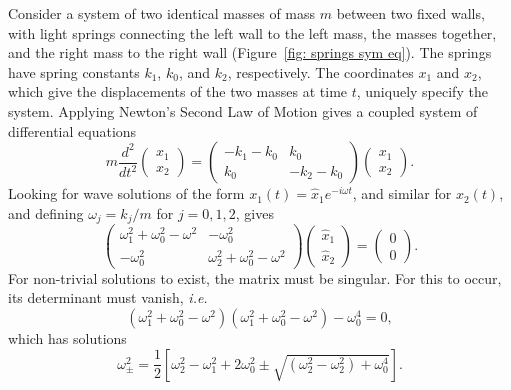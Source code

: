 \documentclass[12pt]{../style-files/ociamthesis}
\begin{document}
Consider a system of two identical masses of mass $m$ between two fixed walls, with light springs connecting the left wall to the left mass, the masses together, and the right mass to the right wall (Figure~\ref{fig: springs sym eq}). The springs have spring constants $k_1$, $k_0$, and $k_2$, respectively. The coordinates $x_1$ and $x_2$, which give the displacements of the two masses at time $t$, uniquely specify the system. Applying Newton's Second Law of Motion gives a coupled system of differential equations
\begin{equation}
	m\frac{d^2}{dt^2}\left(
	\begin{matrix}
		x_1 \\
		x_2
	\end{matrix}
	\right)
	=
	\left(
	\begin{matrix}
		-k_1 - k_0 & k_0 \\
		k_0 & -k_2 - k_0
	\end{matrix}
	\right)
	\left(
	\begin{matrix}
	x_1 \\
	x_2
	\end{matrix}
	\right).
\end{equation}
Looking for wave solutions of the form $x_1(t) = \hat{x}_1 e^{-i\omega t}$, and similar for $x_2(t)$, and defining $\omega_j = k_j/m$ for $j = 0, 1, 2$, gives
\begin{equation}
	\left(
	\begin{matrix}
		\omega_1^2 + \omega_0^2 - \omega^2 & -\omega_0^2 \\
		-\omega_0^2 & \omega_2^2 + \omega_0^2 - \omega^2
	\end{matrix}
	\right)
	\left(
	\begin{matrix}
		\hat{x}_1 \\
		\hat{x}_2
	\end{matrix}
	\right) = 
	\left(
	\begin{matrix}
		0 \\
		0
	\end{matrix}
	\right). \label{coupled oscillator matrix}
\end{equation}
For non-trivial solutions to exist, the matrix must be singular. For this to occur, its determinant must vanish, \textit{i.e.}
\begin{equation}
	(\omega_1^2 + \omega_0^2 - \omega^2)(\omega_1^2 + \omega_0^2 - \omega^2) - \omega_0^4 = 0,
\end{equation}
which has solutions
\begin{equation}
	\omega_\pm^2 = \frac{1}{2}\left[ \omega_2^2 - \omega_1^2 + 2\omega_0^2 \pm \sqrt{(\omega_2^2 - \omega_2^2) + \omega_0^4} \right].
\end{equation}
\end{document}
